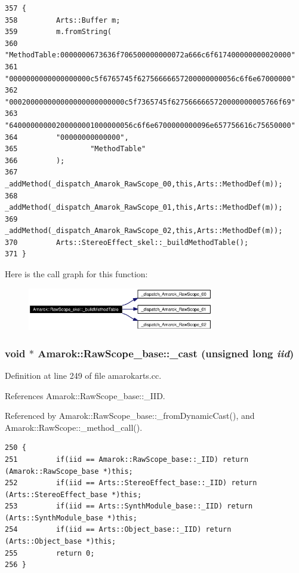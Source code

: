 \footnotesize\begin{verbatim}357 {
358         Arts::Buffer m;
359         m.fromString(
360         "MethodTable:0000000673636f706500000000072a666c6f617400000000020000"
361         "0000000000000000000c5f6765745f62756666657200000000056c6f6e67000000"
362         "000200000000000000000000000c5f7365745f6275666665720000000005766f69"
363         "64000000000200000001000000056c6f6e6700000000096e657756616c75650000"
364         "00000000000000",
365                 "MethodTable"
366         );
367         _addMethod(_dispatch_Amarok_RawScope_00,this,Arts::MethodDef(m));
368         _addMethod(_dispatch_Amarok_RawScope_01,this,Arts::MethodDef(m));
369         _addMethod(_dispatch_Amarok_RawScope_02,this,Arts::MethodDef(m));
370         Arts::StereoEffect_skel::_buildMethodTable();
371 }
\end{verbatim}\normalsize 


Here is the call graph for this function:\begin{figure}[H]
\begin{center}
\leavevmode
\includegraphics[width=230pt]{classAmarok_1_1RawScope__skel_Amarok_1_1RawScope__skela3_cgraph}
\end{center}
\end{figure}
\subsubsection{\setlength{\rightskip}{0pt plus 5cm}void $\ast$ Amarok::Raw\-Scope\_\-base::\_\-cast (unsigned long {\em iid})\hspace{0.3cm}{\tt  [inherited]}}\label{classAmarok_1_1RawScope__base_Amarok_1_1RawScope__stuba7}




Definition at line 249 of file amarokarts.cc.

References Amarok::Raw\-Scope\_\-base::\_\-IID.

Referenced by Amarok::Raw\-Scope\_\-base::\_\-from\-Dynamic\-Cast(), and Amarok::Raw\-Scope::\_\-method\_\-call().



\footnotesize\begin{verbatim}250 {
251         if(iid == Amarok::RawScope_base::_IID) return (Amarok::RawScope_base *)this;
252         if(iid == Arts::StereoEffect_base::_IID) return (Arts::StereoEffect_base *)this;
253         if(iid == Arts::SynthModule_base::_IID) return (Arts::SynthModule_base *)this;
254         if(iid == Arts::Object_base::_IID) return (Arts::Object_base *)this;
255         return 0;
256 }
\end{verbatim}\normalsize 
{}
